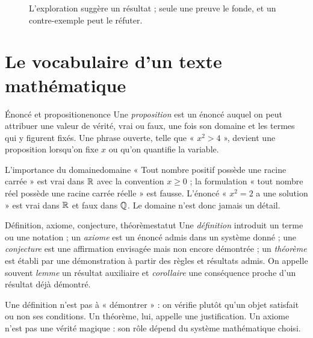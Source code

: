\begin{figure}[htbp]\centering
{}
\caption{L'exploration suggère un résultat ; seule une preuve le fonde, et un contre-exemple peut le réfuter.}\label{fig:log:demarche}
\end{figure}

\section{Le vocabulaire d'un texte mathématique}
\begin{definition}{Énoncé et proposition}{enonce}
Une \emph{proposition} est un énoncé auquel on peut attribuer une valeur de vérité, vrai ou faux, une fois son domaine et les termes qui y figurent fixés. Une phrase ouverte, telle que « $x^2>4$ », devient une proposition lorsqu'on fixe $x$ ou qu'on quantifie la variable.
\end{definition}
\begin{exemple}{L'importance du domaine}{domaine}
« Tout nombre positif possède une racine carrée » est vrai dans $\mathbb R$ avec la convention $x\geq0$ ; la formulation « tout nombre réel possède une racine carrée réelle » est fausse. L'énoncé « $x^2=2$ a une solution » est vrai dans $\mathbb R$ et faux dans $\mathbb Q$. Le domaine n'est donc jamais un détail.
\end{exemple}

\begin{definition}{Définition, axiome, conjecture, théorème}{statut}
Une \emph{définition} introduit un terme ou une notation ; un \emph{axiome} est un énoncé admis dans un système donné ; une \emph{conjecture} est une affirmation envisagée mais non encore démontrée ; un \emph{théorème} est établi par une démonstration à partir des règles et résultats admis. On appelle souvent \emph{lemme} un résultat auxiliaire et \emph{corollaire} une conséquence proche d'un résultat déjà démontré.
\end{definition}
\begin{attention}
Une définition n'est pas à « démontrer » : on vérifie plutôt qu'un objet satisfait ou non ses conditions. Un théorème, lui, appelle une justification. Un axiome n'est pas une vérité magique : son rôle dépend du système mathématique choisi.
\end{attention}

